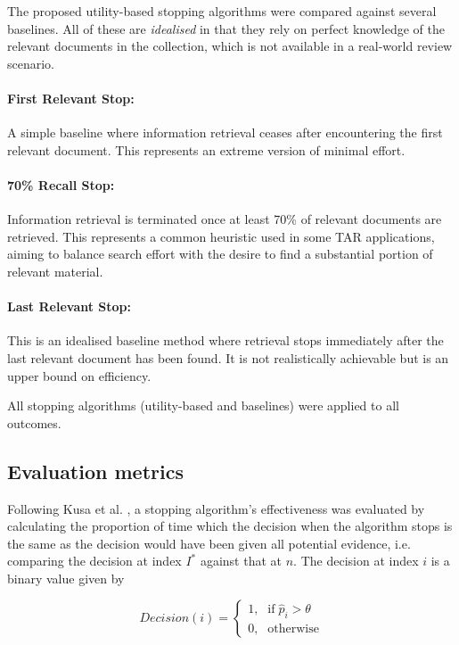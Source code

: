 \documentclass[sigconf,natbib=true,anonymous=true]{acmart}
\begin{document}
The proposed utility-based stopping algorithms were compared against several baselines. All of these are \emph{idealised} in that they rely on perfect knowledge of the relevant documents in the collection, which is not available in a real-world review scenario.

\paragraph{First Relevant Stop:}  A simple baseline where information retrieval ceases after encountering the first relevant document. This represents an extreme version of minimal effort.

\paragraph{70\% Recall Stop:} Information retrieval is terminated once at least 70\% of relevant documents are retrieved. This represents a common heuristic used in some TAR applications, aiming to balance search effort with the desire to find a substantial portion of relevant material.

\paragraph{Last Relevant Stop:}  This is an idealised baseline method where retrieval stops immediately after the last relevant document has been found. It is not realistically achievable but is an upper bound on efficiency.

All stopping algorithms (utility-based and baselines) were applied to all outcomes.

\subsection{Evaluation metrics}


Following Kusa et al. \cite{kusa2023outcome}, a stopping algorithm's effectiveness was evaluated by calculating the proportion of time which the decision when the algorithm stops is the same as the decision would have been given all potential evidence, i.e. comparing the decision at index $I^{*}$ against that at $n$. The decision at index $i$ is a binary value given by 

\begin{equation}
\label{decision}
Decision(i) = 
\begin{cases}
\text{1,} & \text{if} \; \hat{p}_i >\theta\\
\text{0,} & \text{otherwise}
\end{cases}
\end{equation}
\end{document}

